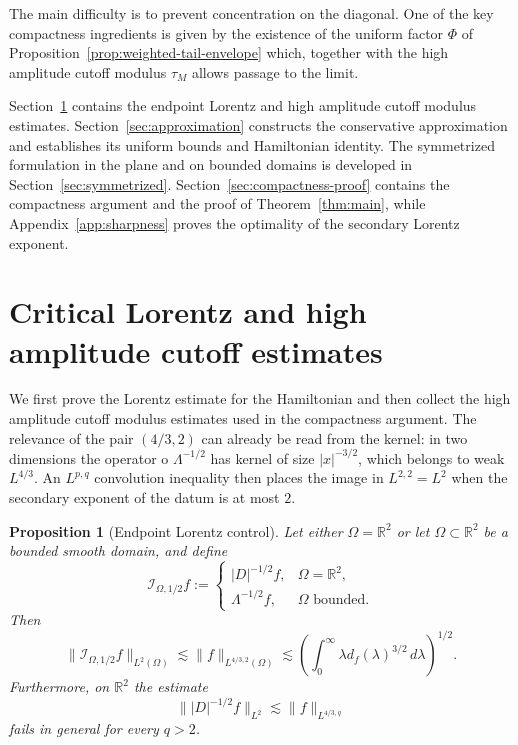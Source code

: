 \documentclass[11pt,reqno]{amsproc}
\newtheorem{proposition}{Proposition}[section]
\newcommand{\R}{\mathbb R}
\newcommand{\Om}{\Omega}
\newcommand{\dd}{\,d}
\newcommand{\Lam}{\Lambda}
\begin{document}
The main difficulty is to prevent concentration on the diagonal.  One of the
key compactness ingredients is given by the existence of the uniform factor $\Phi$ 
of Proposition~\ref{prop:weighted-tail-envelope} which, together with the 
high amplitude cutoff modulus $\tau_M$ allows passage to the limit.

Section~\ref{sec:lorentz-tail} contains the endpoint Lorentz and high amplitude cutoff 
modulus estimates.  Section~\ref{sec:approximation} constructs the conservative
approximation and establishes its uniform bounds and Hamiltonian identity.
The symmetrized formulation in the plane and on bounded domains is developed
in Section~\ref{sec:symmetrized}.  Section~\ref{sec:compactness-proof} contains
the compactness argument and the proof of Theorem~\ref{thm:main}, while
Appendix~\ref{app:sharpness} proves the optimality of the secondary Lorentz
exponent.

\section{Critical Lorentz and high amplitude cutoff estimates}\label{sec:lorentz-tail}

We first prove the Lorentz estimate for the Hamiltonian and then collect the
high amplitude cutoff modulus estimates used in the compactness argument.  The relevance of the pair
$(4/3,2)$ can already be read from the kernel: in two dimensions the operator
o $\Lambda^{-1/2}$ has kernel of size $|x|^{-3/2}$, which belongs to weak
$L^{4/3}$.  An $L^{p,q}$ convolution inequality then places the image in
$L^{2,2}=L^2$ when the secondary exponent of the datum is at most $2$.

\begin{proposition}[Endpoint Lorentz control]\label{prop:critical-lorentz}
Let either $\Om=\R^2$ or let $\Om\subset\R^2$ be a bounded smooth domain, and
define
\[
  \mathcal I_{\Om,1/2}f
  :=
  \begin{cases}
    |D|^{-1/2}f,&\Om=\R^2,\\
    \Lam^{-1/2}f,&\Om\text{ bounded}.
  \end{cases}
\]
Then
\begin{equation}\label{eq:critical-lorentz}
  \|\mathcal I_{\Om,1/2}f\|_{L^2(\Om)}
  \lesssim
  \|f\|_{L^{4/3,2}(\Om)}
  \lesssim
  \left(
  \int_0^\infty \lambda d_f(\lambda)^{3/2}\dd\lambda
  \right)^{1/2}.
\end{equation}
Furthermore, on $\R^2$ the estimate
\[
  \| |D|^{-1/2}f\|_{L^2}\lesssim \|f\|_{L^{4/3,q}}
\]
fails in general for every $q>2$.
\end{proposition}
\end{document}

